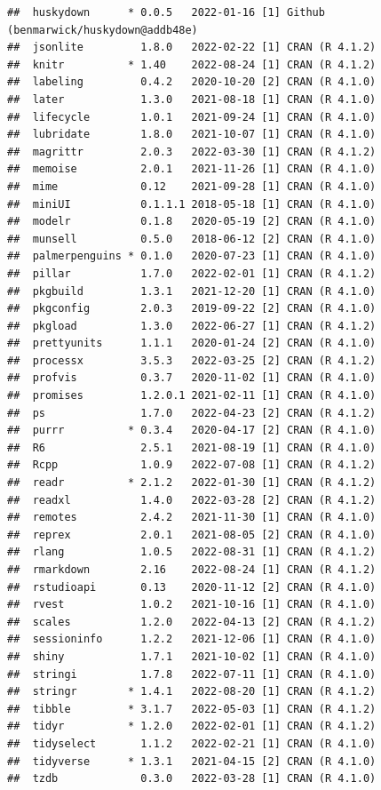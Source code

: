 \documentclass[print]{nuthesis}
\begin{document}
\begin{verbatim}
##  huskydown      * 0.0.5   2022-01-16 [1] Github (benmarwick/huskydown@addb48e)
##  jsonlite         1.8.0   2022-02-22 [1] CRAN (R 4.1.2)
##  knitr          * 1.40    2022-08-24 [1] CRAN (R 4.1.2)
##  labeling         0.4.2   2020-10-20 [2] CRAN (R 4.1.0)
##  later            1.3.0   2021-08-18 [1] CRAN (R 4.1.0)
##  lifecycle        1.0.1   2021-09-24 [1] CRAN (R 4.1.0)
##  lubridate        1.8.0   2021-10-07 [1] CRAN (R 4.1.0)
##  magrittr         2.0.3   2022-03-30 [1] CRAN (R 4.1.2)
##  memoise          2.0.1   2021-11-26 [1] CRAN (R 4.1.0)
##  mime             0.12    2021-09-28 [1] CRAN (R 4.1.0)
##  miniUI           0.1.1.1 2018-05-18 [1] CRAN (R 4.1.0)
##  modelr           0.1.8   2020-05-19 [2] CRAN (R 4.1.0)
##  munsell          0.5.0   2018-06-12 [2] CRAN (R 4.1.0)
##  palmerpenguins * 0.1.0   2020-07-23 [1] CRAN (R 4.1.0)
##  pillar           1.7.0   2022-02-01 [1] CRAN (R 4.1.2)
##  pkgbuild         1.3.1   2021-12-20 [1] CRAN (R 4.1.0)
##  pkgconfig        2.0.3   2019-09-22 [2] CRAN (R 4.1.0)
##  pkgload          1.3.0   2022-06-27 [1] CRAN (R 4.1.2)
##  prettyunits      1.1.1   2020-01-24 [2] CRAN (R 4.1.0)
##  processx         3.5.3   2022-03-25 [2] CRAN (R 4.1.2)
##  profvis          0.3.7   2020-11-02 [1] CRAN (R 4.1.0)
##  promises         1.2.0.1 2021-02-11 [1] CRAN (R 4.1.0)
##  ps               1.7.0   2022-04-23 [2] CRAN (R 4.1.2)
##  purrr          * 0.3.4   2020-04-17 [2] CRAN (R 4.1.0)
##  R6               2.5.1   2021-08-19 [1] CRAN (R 4.1.0)
##  Rcpp             1.0.9   2022-07-08 [1] CRAN (R 4.1.2)
##  readr          * 2.1.2   2022-01-30 [1] CRAN (R 4.1.2)
##  readxl           1.4.0   2022-03-28 [2] CRAN (R 4.1.2)
##  remotes          2.4.2   2021-11-30 [1] CRAN (R 4.1.0)
##  reprex           2.0.1   2021-08-05 [2] CRAN (R 4.1.0)
##  rlang            1.0.5   2022-08-31 [1] CRAN (R 4.1.2)
##  rmarkdown        2.16    2022-08-24 [1] CRAN (R 4.1.2)
##  rstudioapi       0.13    2020-11-12 [2] CRAN (R 4.1.0)
##  rvest            1.0.2   2021-10-16 [1] CRAN (R 4.1.0)
##  scales           1.2.0   2022-04-13 [2] CRAN (R 4.1.2)
##  sessioninfo      1.2.2   2021-12-06 [1] CRAN (R 4.1.0)
##  shiny            1.7.1   2021-10-02 [1] CRAN (R 4.1.0)
##  stringi          1.7.8   2022-07-11 [1] CRAN (R 4.1.0)
##  stringr        * 1.4.1   2022-08-20 [1] CRAN (R 4.1.2)
##  tibble         * 3.1.7   2022-05-03 [1] CRAN (R 4.1.2)
##  tidyr          * 1.2.0   2022-02-01 [1] CRAN (R 4.1.2)
##  tidyselect       1.1.2   2022-02-21 [1] CRAN (R 4.1.0)
##  tidyverse      * 1.3.1   2021-04-15 [2] CRAN (R 4.1.0)
##  tzdb             0.3.0   2022-03-28 [1] CRAN (R 4.1.0)

\end{verbatim}
\end{document}
